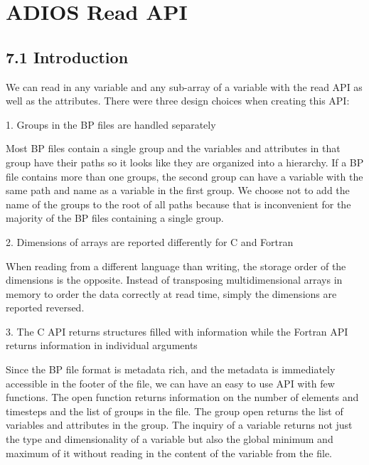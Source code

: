 \vspace{22pt}
\section{ADIOS Read API}

\vspace{24pt}
\subsection*{{\large 7.1 }{\large \textbf{Introduction}}}

\vspace{10pt}
We can read in any variable and any sub-array of a variable with the read API as 
well as the attributes. There were three design choices when creating this API:

\vspace{10pt}
1. Groups in the BP files are handled separately

\vspace{10pt}
\leftskip=22pt
Most BP files contain a single group and the variables and attributes in that group 
have their paths so it looks like they are organized into a hierarchy. If a BP 
file contains more than one groups, the second group can have a variable with the 
same path and name as a variable in the first group. We choose not to add the name 
of the groups to the root of all paths because that is inconvenient for the majority 
of the BP files containing a single group.

\vspace{10pt}
\leftskip=0pt
2. Dimensions of arrays are reported differently for C and Fortran

\vspace{10pt}
\leftskip=22pt
When reading from a different language than writing, the storage order of the dimensions 
is the opposite. Instead of transposing multidimensional arrays in memory to order 
the data correctly at read time, simply the dimensions are reported reversed. 

\vspace{10pt}
\leftskip=0pt
3. The C API returns structures filled with information while the Fortran API returns 
information in individual arguments

\vspace{10pt}
\leftskip=22pt
Since the BP file format is metadata rich, and the metadata is immediately accessible 
in the footer of the file, we can have an easy to use API with few functions. The 
open function returns information on the number of elements and timesteps and the 
list of groups in the file. The group open returns the list of variables and attributes 
in the group. The inquiry of a variable returns not just the type and dimensionality 
of a variable but also the global minimum and maximum of it without reading in 
the content of the variable from the file. 

